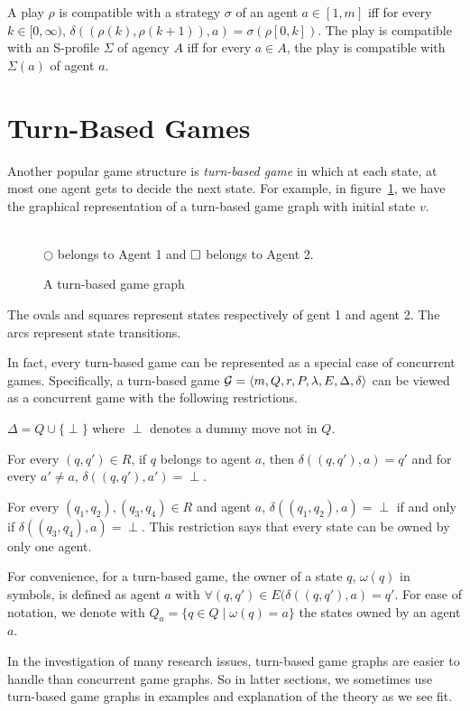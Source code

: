 A play $\rho$ is compatible with a strategy
$\sigma$ of an agent $a\in [1,m]$
iff for every $k\in [0,\infty)$,
$\delta((\rho(k),\rho(k+1)),a)=\sigma(\rho[0,k])$.
The play is compatible with an S-profile $\Sigma$ of agency $A$ iff for every $a\in A$, the play is compatible with $\Sigma(a)$ of agent $a$.

\section{Turn-Based Games}
Another popular game structure is {\em turn-based game} in which at each state, at most one agent gets to decide the next state.
For example, in figure~\ref{fig.tg}, we have the graphical representation of a turn-based game graph with initial state $v$.
\begin{figure}[!ht]
\begin{center}
 \\
$\bigcirc$ belongs to Agent 1 and $\Box$ belongs to Agent 2.
\end{center}
\caption{A turn-based game graph}
\label{fig.tg}
\end{figure} 
The ovals and squares represent states respectively of gent 1 and agent 2.
The arcs represent state transitions.  

In fact, every turn-based game can be represented as a special case of 
concurrent games.  
Specifically, a turn-based game 
${\cal G}=\langle m,Q,r,P,\lambda,E,\Delta,\delta\rangle$ 
can be viewed as a concurrent game with the following restrictions. 
\begin{list1} 
\item $\Delta=Q\cup\{\perp\}$ where $\perp$ denotes a dummy move not in $Q$. 
\item For every $(q,q')\in R$, if $q$ belongs to agent $a$, 
	then $\delta((q,q'),a)=q'$ and 
	for every $a'\neq a$, $\delta((q,q'),a')=\perp$. 
\item For every $(q_1,q_2),(q_3,q_4)\in R$ and agent $a$, 
	$\delta((q_1,q_2),a)=\perp$ if and only if $\delta((q_3,q_4),a)=\perp$.  
	This restriction says that every state can be owned by only one agent. 
\end{list1} 
For convenience, for a turn-based game, the owner of a state $q$, $\omega(q)$ in symbols, is defined as agent $a$ with $\forall (q,q')\in E(\delta((q,q'),a)=q'$.  
For ease of notation, we denote with $Q_a = \{q \in Q \mid \omega(q)=a\}$ the states owned by an agent $a$.

In the investigation of many research issues, turn-based game graphs are easier to handle than concurrent game graphs.   
So in latter sections, we sometimes use turn-based game graphs in examples and explanation of the theory as we see fit.

